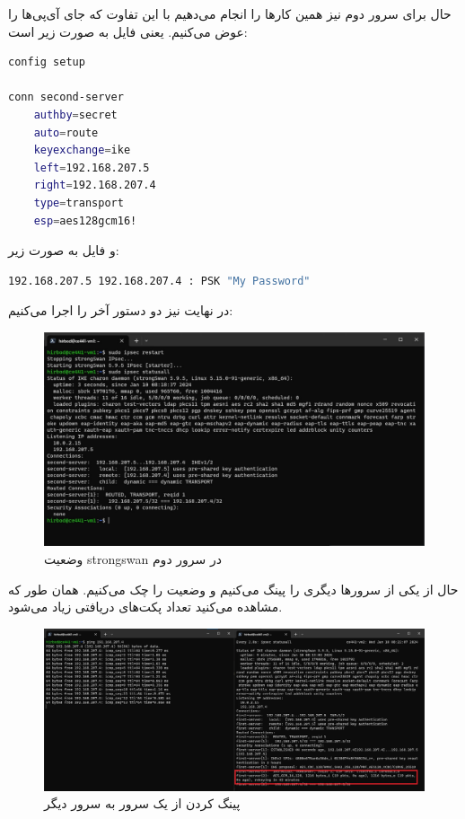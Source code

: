 \documentclass[]{article}
\begin{document}
حال برای سرور دوم نیز همین کارها را انجام می‌دهیم با این تفاوت که جای آی‌پی‌ها را عوض می‌کنیم.
یعنی فایل
به صورت زیر است:
\begin{latin}
\begin{lstlisting}[language=sh]
config setup

conn second-server
    authby=secret
    auto=route
    keyexchange=ike
    left=192.168.207.5
    right=192.168.207.4
    type=transport
    esp=aes128gcm16!
\end{lstlisting}
\end{latin}
و فایل
به صورت زیر:
\begin{latin}
\begin{lstlisting}[language=sh]
192.168.207.5 192.168.207.4 : PSK "My Password"
\end{lstlisting}
\end{latin}
در نهایت نیز دو دستور آخر را اجرا می‌کنیم:
\begin{figure}[H]
    \centering
    \includegraphics[scale=0.5]{pics/ipsec-stat2.jpg}
    \caption{وضعیت strongswan در سرور دوم}
\end{figure}
حال از یکی از سرور‌ها دیگری را پینگ می‌کنیم و وضعیت
را چک می‌کنیم. همان طور که مشاهده می‌کنید تعداد پکت‌های دریافتی زیاد می‌شود.
\begin{figure}[H]
    \centering
    \includegraphics[scale=0.32]{pics/ipsec-ping.jpg}
    \caption{پینگ کردن از یک سرور به سرور دیگر}
\end{figure}
\end{document}
